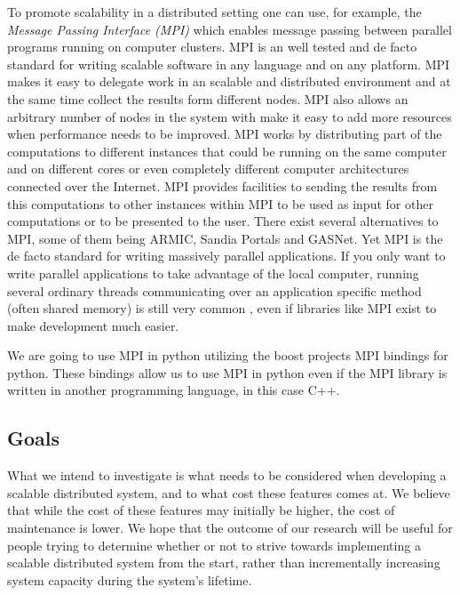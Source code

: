 \documentclass{article}
\begin{document}
To promote scalability in a distributed setting one can use, for example, the
\emph{Message Passing Interface (MPI)} which enables message passing between
parallel programs running on computer clusters. MPI is
an well tested and de facto\cite{wu2008using} standard for writing scalable
software in any language and on any platform. MPI makes it easy to delegate
work in an scalable and distributed environment and at the same time collect
the results form different nodes. MPI also allows an arbitrary number of nodes
in the system with make it easy to add more resources when performance needs to
be improved. \cite{gropp1996high}
\newline
MPI works by distributing part of the computations to different instances that
could be running on the same computer and on different cores or even completely
different computer architectures connected over the Internet. MPI provides
facilities to sending the results from this computations to other instances
within MPI to be used as input for other computations or to be presented to the
user. There exist several alternatives\cite{mpialternatives} to MPI, some of
them being ARMIC, Sandia Portals and GASNet. Yet MPI is the de facto
\cite{mpialternatives} standard for writing massively parallel applications. If
you only want to write parallel applications to take advantage of the local
computer, running several ordinary threads communicating over an application
specific method (often shared memory) is still very common \cite{getov1998high},
even if libraries like MPI exist to make development much easier.

We are going to use MPI in python utilizing the boost projects MPI bindings
for python. These bindings allow us to use MPI in python even if the MPI library
is written in another programming language, in this case C++.
 
\subsection{Goals} 

What we intend to investigate is what needs to be considered
when developing a scalable distributed system, and to what cost these features
comes at. We believe that while the cost of these features may initially be
higher, the cost of maintenance is lower. We hope that the outcome of our
research will be useful for people trying to determine whether or not to strive
towards implementing a scalable distributed system from the start, rather than
incrementally increasing system capacity during the system's lifetime.
\end{document}
